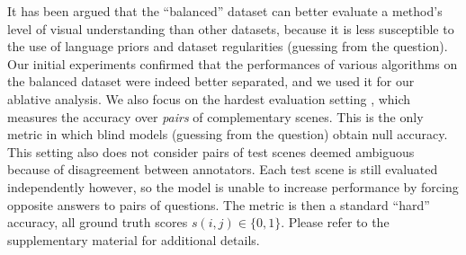 It has been argued that the ``balanced'' dataset can better evaluate a method's level of visual understanding than other datasets, because it is less susceptible to the use of language priors and dataset regularities (\ie guessing from the question\cite{zhang2015balanced}). Our initial experiments confirmed that the performances of various algorithms on the balanced dataset were indeed better separated, and we used it for our ablative analysis. We also focus on the hardest evaluation setting \cite{zhang2015balanced}, which measures the accuracy over \emph{pairs} of complementary scenes. This is the only metric in which blind models (guessing from the question) obtain null accuracy. This setting also does not consider pairs of test scenes deemed ambiguous because of disagreement between annotators. Each test scene is still evaluated independently however, so the model is unable to increase performance by forcing opposite answers to pairs of questions. The metric is then a standard ``hard'' accuracy, \ie all ground truth scores $s(i,j)\in\{0,1\}$. Please refer to the supplementary material for additional details.

